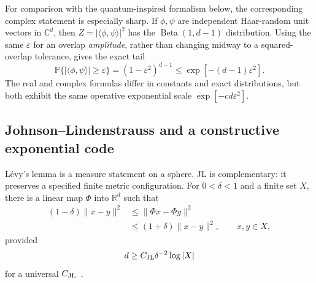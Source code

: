 \documentclass[
  aps,
  reprint,
  superscriptaddress,
  floatfix,
  nofootinbib,
  longbibliography
]{revtex4-2}
\newcommand{\R}{\mathbb{R}}
\newcommand{\Prob}{\mathbb{P}}
\newcommand{\norm}[1]{\lVert #1 \rVert}
\begin{document}
For comparison with the quantum-inspired formalism below, the corresponding
complex statement is especially sharp.  If $\phi,\psi$ are independent
Haar-random unit vectors in $\mathbb C^d$, then
$Z=|\langle\phi,\psi\rangle|^2$ has the
$\operatorname{Beta}(1,d-1)$ distribution.  Using the same
$\varepsilon$ for an overlap \emph{amplitude}, rather than changing midway to
a squared-overlap tolerance, gives the exact tail
\begin{equation}
\label{eq:complex-haar-tail}
\Prob\{|\langle\phi,\psi\rangle|\geq\varepsilon\}
=(1-\varepsilon^2)^{d-1}
\leq
\exp[-(d-1)\varepsilon^2].
\end{equation}
The real and complex formulas differ in constants and exact distributions,
but both exhibit the same operative exponential scale
$\exp[-c d\varepsilon^2]$.

\subsection{Johnson--Lindenstrauss and a constructive exponential code}
\label{sec:jl}

L\'evy's lemma is a measure statement on a sphere.  JL is complementary: it
preserves a specified finite metric configuration.  For
$0<\delta<1$ and a finite set $X$, there is a linear map
$\Phi$ into $\R^d$ such that
\begin{equation}
\label{eq:jl}
\begin{aligned}
(1-\delta)\norm{x-y}^2
&\leq\norm{\Phi x-\Phi y}^2\\
&\leq(1+\delta)\norm{x-y}^2,
\qquad x,y\in X,
\end{aligned}
\end{equation}
provided
\begin{equation}
\label{eq:jl-dimension}
d\geq C_{\rm JL}\delta^{-2}\log |X|
\end{equation}
for a universal $C_{\rm JL}$~\cite{johnson-1984,Dasgupta-2003}.
\end{document}
